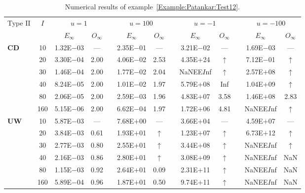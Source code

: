 {\renewcommand{\baselinestretch}{1.0}
\begin{table}[H]
\caption{Numerical results of example~\ref{Example:Patankar:Test12}.}

\footnotesize
\centering
\begin{tabular}{@{}l c c c c c c c c c c c c@{}}
\toprule
\multirow{2}{*}{Type II} & \multirow{2}{*}{$I$} & \multicolumn{2}{c}{$u=1$} & \multicolumn{1}{c}{} & \multicolumn{2}{c}{$u=100$} & \multicolumn{1}{c}{} & \multicolumn{2}{c}{$u=-1$} & \multicolumn{1}{c}{} & \multicolumn{2}{c}{$u=-100$}\\
\cline{3-4}
\cline{6-7}
\cline{9-10}
\cline{12-13}
&  & \multicolumn{1}{c}{$E_{\infty}$} & \multicolumn{1}{c}{$O_{\infty}$} & \multicolumn{1}{c}{} & \multicolumn{1}{c}{$E_{\infty}$} & \multicolumn{1}{c}{$O_{\infty}$} & \multicolumn{1}{c}{} & \multicolumn{1}{c}{$E_{\infty}$} & \multicolumn{1}{c}{$O_{\infty}$} & \multicolumn{1}{c}{} & \multicolumn{1}{c}{$E_{\infty}$} & \multicolumn{1}{c}{$O_{\infty}$}\\
\midrule
\multirow{6}{*}{\textbf{CD}}
& 10 & 1.32E$-$03 & --- &  & 2.35E$-$01 & --- &  & 3.21E$-$02 & --- &  & 1.69E$-$03 & ---\\
& 20 & 3.30E$-$04 & 2.00 &  & 4.06E$-$02 & 2.53 &  & 4.35E$+$24 & $\uparrow$ &  & 7.12E$-$01 & $\uparrow$\\
& 30 & 1.46E$-$04 & 2.00 &  & 1.77E$-$02 & 2.04 &  & NaNEE$I$nf & $\uparrow$ &  & 2.57E$+$08 & $\uparrow$\\
& 40 & 8.24E$-$05 & 2.00 &  & 1.01E$-$02 & 1.97 &  & 5.79E$+$08 & Inf &  & 1.04E$+$09 & $\uparrow$\\
& 80 & 2.06E$-$05 & 2.00 &  & 2.59E$-$03 & 1.96 &  & 4.83E$+$07 & 3.58 &  & 1.46E$+$08 & 2.83\\
& 160 & 5.15E$-$06 & 2.00 &  & 6.62E$-$04 & 1.97 &  & 1.72E$+$06 & 4.81 &  & NaNEE$I$nf & $\uparrow$\\
\midrule
\multirow{6}{*}{\textbf{UW}}
& 10 & 5.87E$-$03 & --- &  & 7.68E$+$00 & --- &  & 3.66E$+$04 & --- &  & 4.59E$+$07 & ---\\
& 20 & 3.84E$-$03 & 0.61 &  & 1.93E$+$01 & $\uparrow$ &  & 1.23E$+$07 & $\uparrow$ &  & 6.73E$+$12 & $\uparrow$\\
& 30 & 2.77E$-$03 & 0.80 &  & 2.55E$+$01 & $\uparrow$ &  & 3.44E$+$08 & $\uparrow$ &  & NaNEE$I$nf & $\uparrow$\\
& 40 & 2.16E$-$03 & 0.86 &  & 2.80E$+$01 & $\uparrow$ &  & 3.08E$+$09 & $\uparrow$ &  & NaNEE$I$nf & NaN\\
& 80 & 1.15E$-$03 & 0.92 &  & 2.64E$+$01 & 0.09 &  & 2.31E$+$11 & $\uparrow$ &  & NaNEE$I$nf & NaN\\
& 160 & 5.89E$-$04 & 0.96 &  & 1.87E$+$01 & 0.50 &  & 9.74E$+$11 & $\uparrow$ &  & NaNEE$I$nf & NaN\\
\bottomrule
\end{tabular}
\label{Table:Patankar:Test12}
\end{table}}
